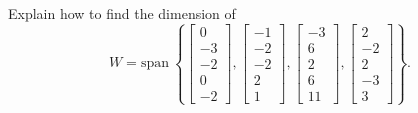 \documentclass{article}
\begin{document}
\begin{exerciseStatement}
    Explain how to find the dimension of
\[W=\mathrm{span}\ \left\{\left[\begin{array}{r}
0 \\
-3 \\
-2 \\
0 \\
-2
\end{array}\right] , \left[\begin{array}{r}
-1 \\
-2 \\
-2 \\
2 \\
1
\end{array}\right] , \left[\begin{array}{r}
-3 \\
6 \\
2 \\
6 \\
11
\end{array}\right] , \left[\begin{array}{r}
2 \\
-2 \\
2 \\
-3 \\
3
\end{array}\right]\right\}.\]



  
\end{exerciseStatement}
\end{document}
